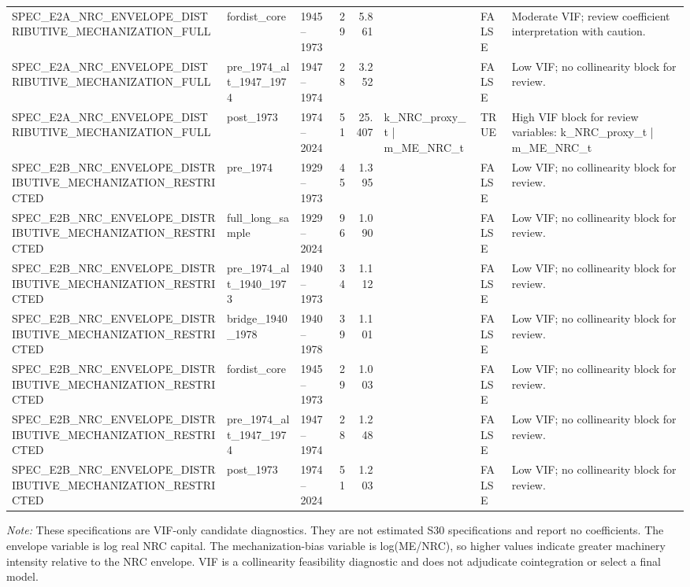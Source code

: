 \begin{table}[!htbp]
\begin{tabular}{lllrrlll}
SPEC\_E2A\_NRC\_ENVELOPE\_DISTRIBUTIVE\_MECHANIZATION\_FULL & fordist\_core & 1945--1973 & 29 & 5.861 &  & FALSE & Moderate VIF; review coefficient interpretation with caution. \\
SPEC\_E2A\_NRC\_ENVELOPE\_DISTRIBUTIVE\_MECHANIZATION\_FULL & pre\_1974\_alt\_1947\_1974 & 1947--1974 & 28 & 3.252 &  & FALSE & Low VIF; no collinearity block for review. \\
SPEC\_E2A\_NRC\_ENVELOPE\_DISTRIBUTIVE\_MECHANIZATION\_FULL & post\_1973 & 1974--2024 & 51 & 25.407 & k\_NRC\_proxy\_t | m\_ME\_NRC\_t & TRUE & High VIF block for review variables: k\_NRC\_proxy\_t | m\_ME\_NRC\_t \\
SPEC\_E2B\_NRC\_ENVELOPE\_DISTRIBUTIVE\_MECHANIZATION\_RESTRICTED & pre\_1974 & 1929--1973 & 45 & 1.395 &  & FALSE & Low VIF; no collinearity block for review. \\
SPEC\_E2B\_NRC\_ENVELOPE\_DISTRIBUTIVE\_MECHANIZATION\_RESTRICTED & full\_long\_sample & 1929--2024 & 96 & 1.090 &  & FALSE & Low VIF; no collinearity block for review. \\
SPEC\_E2B\_NRC\_ENVELOPE\_DISTRIBUTIVE\_MECHANIZATION\_RESTRICTED & pre\_1974\_alt\_1940\_1973 & 1940--1973 & 34 & 1.112 &  & FALSE & Low VIF; no collinearity block for review. \\
SPEC\_E2B\_NRC\_ENVELOPE\_DISTRIBUTIVE\_MECHANIZATION\_RESTRICTED & bridge\_1940\_1978 & 1940--1978 & 39 & 1.101 &  & FALSE & Low VIF; no collinearity block for review. \\
SPEC\_E2B\_NRC\_ENVELOPE\_DISTRIBUTIVE\_MECHANIZATION\_RESTRICTED & fordist\_core & 1945--1973 & 29 & 1.003 &  & FALSE & Low VIF; no collinearity block for review. \\
SPEC\_E2B\_NRC\_ENVELOPE\_DISTRIBUTIVE\_MECHANIZATION\_RESTRICTED & pre\_1974\_alt\_1947\_1974 & 1947--1974 & 28 & 1.248 &  & FALSE & Low VIF; no collinearity block for review. \\
SPEC\_E2B\_NRC\_ENVELOPE\_DISTRIBUTIVE\_MECHANIZATION\_RESTRICTED & post\_1973 & 1974--2024 & 51 & 1.203 &  & FALSE & Low VIF; no collinearity block for review. \\
\hline
\end{tabular}
\begin{minipage}{0.98\textwidth}
\footnotesize \textit{Note:} These specifications are VIF-only candidate diagnostics. They are not estimated S30 specifications and report no coefficients. The envelope variable is log real NRC capital. The mechanization-bias variable is log(ME/NRC), so higher values indicate greater machinery intensity relative to the NRC envelope. VIF is a collinearity feasibility diagnostic and does not adjudicate cointegration or select a final model.
\end{minipage}
\end{table}
